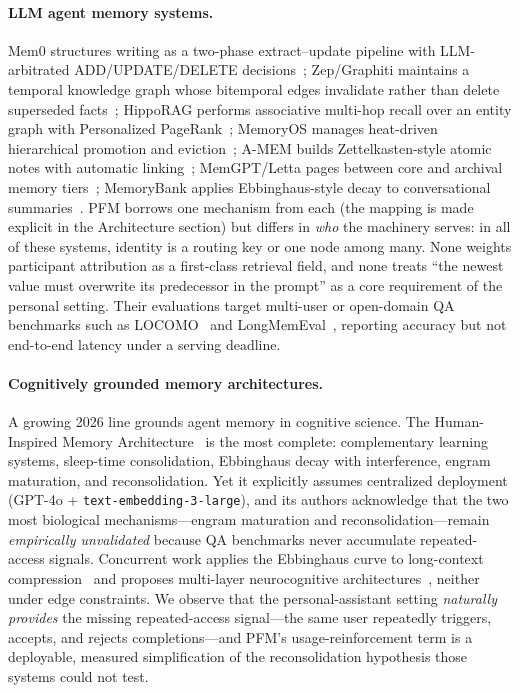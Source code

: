 \documentclass[letterpaper]{article}
\begin{document}
\paragraph{LLM agent memory systems.}
Mem0 structures writing as a two-phase extract--update pipeline with
LLM-arbitrated ADD/UPDATE/DELETE decisions~\citep{chhikara2025mem0};
Zep/Graphiti maintains a temporal knowledge graph whose bitemporal edges
invalidate rather than delete superseded facts~\citep{rasmussen2025zep};
HippoRAG performs associative multi-hop recall over an entity graph with
Personalized PageRank~\citep{gutierrez2024hipporag}; MemoryOS manages
heat-driven hierarchical promotion and eviction~\citep{memoryos2025};
A-MEM builds Zettelkasten-style atomic notes with automatic
linking~\citep{xu2025amem}; MemGPT/Letta pages between core and archival
memory tiers~\citep{packer2023memgpt}; MemoryBank applies
Ebbinghaus-style decay to conversational summaries~\citep{zhong2023memorybank}.
PFM borrows one mechanism from each (the mapping is made explicit in the
Architecture section) but differs in \emph{who} the machinery serves: in
all of these systems, identity is a routing key or one node among many.
None weights participant attribution as a first-class retrieval field, and
none treats ``the newest value must overwrite its predecessor in the
prompt'' as a core requirement of the personal setting. Their evaluations
target multi-user or open-domain QA benchmarks such as
LOCOMO~\citep{maharana2024evaluating} and
LongMemEval~\citep{wu2024longmemeval}, reporting accuracy but not
end-to-end latency under a serving deadline.

\paragraph{Cognitively grounded memory architectures.}
A growing 2026 line grounds agent memory in cognitive science. The
Human-Inspired Memory Architecture~\citep{kerestecioglu2026human} is the
most complete: complementary learning systems, sleep-time consolidation,
Ebbinghaus decay with interference, engram maturation, and
reconsolidation. Yet it explicitly assumes centralized deployment
(GPT-4o + \texttt{text-embedding-3-large}), and its authors acknowledge
that the two most biological mechanisms---engram maturation and
reconsolidation---remain \emph{empirically unvalidated} because QA
benchmarks never accumulate repeated-access signals. Concurrent work
applies the Ebbinghaus curve to long-context
compression~\citep{icict2026ebbinghaus} and proposes multi-layer
neurocognitive architectures~\citep{zenbrain2026}, neither under edge
constraints. We observe that the personal-assistant setting
\emph{naturally provides} the missing repeated-access signal---the same
user repeatedly triggers, accepts, and rejects completions---and PFM's
usage-reinforcement term is a deployable, measured simplification of the
reconsolidation hypothesis those systems could not test.
\end{document}
